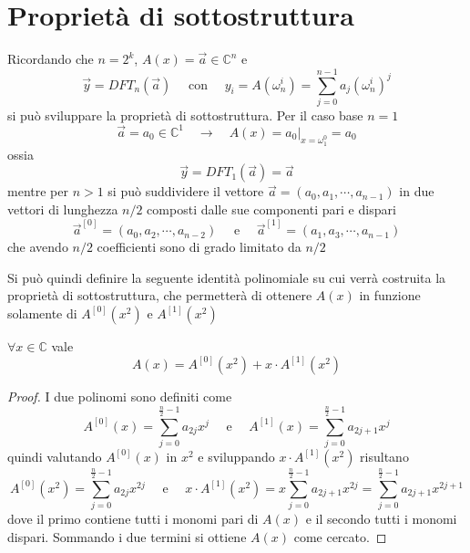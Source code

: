 \section{Proprietà di sottostruttura}
Ricordando che $n=2^k$, $A(x) = \vec{a} \in \mathbb{C}^n$ e 
\begin{equation*}
    \vec{y} = DFT_n \left( \vec{a} \right) \quad \text{ con }
    \quad y_i = 
    A\left( \omega_n^i \right) = 
    \sum_{j=0}^{n-1} a_j \left( \omega_n^{i} \right)^{j}
\end{equation*}
si può sviluppare la proprietà di sottostruttura.
Per il caso base $n=1$
\begin{equation*}
    \vec{a} = a_0 \in \mathbb{C}^1
    \quad \rightarrow \quad
    A(x) = a_0 \bigr|_{x=\omega_1^0} = a_0
\end{equation*}
ossia
\begin{equation*}
    \vec{y} = DFT_1 \left( \vec{a} \right) = \vec{a}
\end{equation*}
mentre per $n>1$ si può suddividere il vettore
$\vec{a}=\left( a_0, a_1,\cdots, a _{n-1} \right)$ in due vettori di lunghezza $n/2$ composti dalle sue componenti pari e dispari
\begin{equation*}
    \vec{a}^{[0]}=\left( a_0, a_2,\cdots, a _{n-2} \right)
    \quad \text{ e } \quad
    \vec{a}^{[1]}=\left( a_1, a_3,\cdots, a _{n-1} \right)
\end{equation*}
che avendo $n/2$ coefficienti sono di grado limitato da $n/2$

Si può quindi definire la seguente identità polinomiale su cui verrà costruita la proprietà di sottostruttura, che permetterà di ottenere $A(x)$ in funzione solamente di $A^{[0]} \left( x^2 \right)$ e $A^{[1]} \left( x^2 \right)$ 
\begin{definition}
    $\forall x \in \mathbb{C}$ vale
    \begin{equation*}
        A(x) = A^{[0]} \left( x^2 \right) + x \cdot A^{[1]} \left( x^2 \right) 
    \end{equation*}
    \label{def:identitapolinomiale}
\end{definition}
\begin{proof}
    I due polinomi sono definiti come
    \begin{equation*}
        A^{[0]}(x) = \sum_{j=0}^{\frac{n}{2}-1} a_{2j}x^j
        \quad \text{ e } \quad
        A^{[1]}(x) = \sum_{j=0}^{\frac{n}{2}-1} a_{2j+1}x^j
    \end{equation*}
    quindi valutando $A^{[0]}(x)$ in $x^2$ e sviluppando $x \cdot A^{[1]} \left( x^2 \right) $ risultano
    \begin{equation*}
        A^{[0]} \left( x^2 \right) = \sum_{j=0}^{\frac{n}{2}-1} a_{2j}x^{2j}
        \quad \text{ e } \quad
        x \cdot A^{[1]} \left( x^2 \right) =
        x \sum_{j=0}^{\frac{n}{2}-1} a_{2j+1}x^{2j} = 
        \sum_{j=0}^{\frac{n}{2}-1} a_{2j+1}x^{2j+1}
    \end{equation*}
    dove il primo contiene tutti i monomi pari di $A(x)$ e il secondo tutti i monomi dispari. Sommando i due termini si ottiene $A(x)$ come cercato.
\end{proof}

